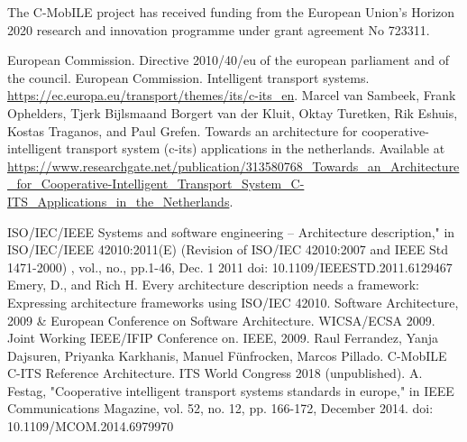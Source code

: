 \documentclass[conference]{IEEEtran}
\begin{document}
The C-MobILE project has received funding from the European Union’s Horizon 2020 research and innovation programme under grant agreement No 723311.


\begin{thebibliography}{00}

     European Commission. Directive 2010/40/eu of the european parliament and of the council.
     European Commission. Intelligent transport systems. \url{https://ec.europa.eu/transport/themes/its/c-its_en}.
     Marcel van Sambeek, Frank Ophelders, Tjerk Bijlsmaand Borgert van der Kluit, Oktay Turetken, Rik Eshuis, Kostas Traganos, and Paul Grefen. Towards an architecture for cooperative-intelligent transport system (c-its) applications in the netherlands. Available at \url{ https://www.researchgate.net/publication/313580768_Towards_an_Architecture_for_Cooperative-Intelligent_Transport_System_C-ITS_Applications_in_the_Netherlands}.

     ISO/IEC/IEEE Systems and software engineering -- Architecture description," in ISO/IEC/IEEE 42010:2011(E) (Revision of ISO/IEC 42010:2007 and IEEE Std 1471-2000) , vol., no., pp.1-46, Dec. 1 2011 doi: 10.1109/IEEESTD.2011.6129467
    Emery, D., and Rich H. Every architecture description needs a framework: Expressing architecture frameworks using ISO/IEC 42010. Software Architecture, 2009 \& European Conference on Software Architecture. WICSA/ECSA 2009. Joint Working IEEE/IFIP Conference on. IEEE, 2009.
    Raul Ferrandez, Yanja Dajsuren, Priyanka Karkhanis, Manuel Fünfrocken, Marcos Pillado. C-MobILE C-ITS Reference Architecture. ITS World Congress 2018 (unpublished).
    A. Festag, "Cooperative intelligent transport systems standards in europe," in IEEE Communications Magazine, vol. 52, no. 12, pp. 166-172, December 2014.  doi: 10.1109/MCOM.2014.6979970

\end{thebibliography}
\end{document}
